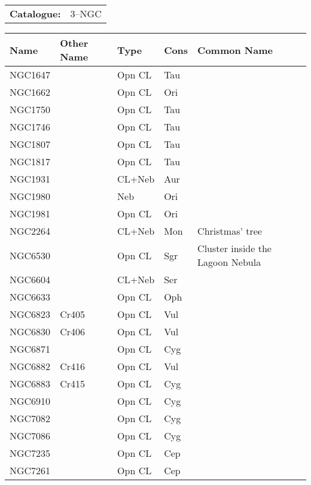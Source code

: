 \begin{tabular}{ p{0.9in} p{1.3in}}
{\bf Catalogue:} & 3--NGC \\ 
\end{tabular}
\begin{longtable}{ p{0.7in}  p{1.0in}  p{0.6in}  p{0.9in}  p{5.1in} }
\hline 
{\bf Name} & {\bf Other Name} & {\bf Type} & {\bf Cons} & {\bf Common Name} \\ 
\hline 
NGC1647 &  & Opn CL & Tau &  \\ 
NGC1662 &  & Opn CL & Ori &  \\ 
NGC1750 &  & Opn CL & Tau &  \\ 
NGC1746 &  & Opn CL & Tau &  \\ 
NGC1807 &  & Opn CL & Tau &  \\ 
NGC1817 &  & Opn CL & Tau &  \\ 
NGC1931 &  & CL+Neb & Aur &  \\ 
NGC1980 &  & Neb & Ori &  \\ 
NGC1981 &  & Opn CL & Ori &  \\ 
NGC2264 &  & CL+Neb & Mon & Christmas' tree \\ 
NGC6530 &  & Opn CL & Sgr & Cluster inside the Lagoon Nebula \\ 
NGC6604 &  & CL+Neb & Ser &  \\ 
NGC6633 &  & Opn CL & Oph &  \\ 
NGC6823 & Cr405 & Opn CL & Vul &  \\ 
NGC6830 & Cr406 & Opn CL & Vul &  \\ 
NGC6871 &  & Opn CL & Cyg &  \\ 
NGC6882 & Cr416 & Opn CL & Vul &  \\ 
NGC6883 & Cr415 & Opn CL & Cyg &  \\ 
NGC6910 &  & Opn CL & Cyg &  \\ 
NGC7082 &  & Opn CL & Cyg &  \\ 
NGC7086 &  & Opn CL & Cyg &  \\ 
NGC7235 &  & Opn CL & Cep &  \\ 
NGC7261 &  & Opn CL & Cep &  \\ 
\hline 
\end{longtable} 
